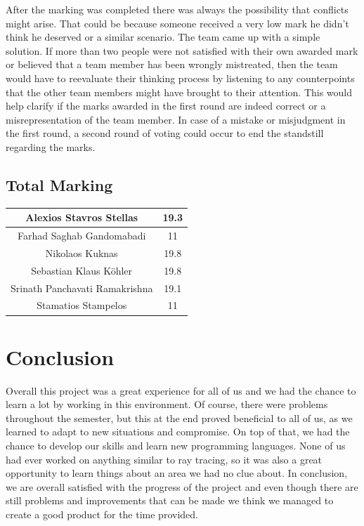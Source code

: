 \documentclass[10pt]{scrartcl}
\begin{document}
After the marking was completed there was always the possibility that conflicts might arise. That could be because someone received a very low mark he didn’t think he deserved or a similar scenario. The team came up with a simple solution. If more than two people were not satisfied with their own awarded mark or believed that a team member has been wrongly mistreated, then the team would have to reevaluate their thinking process by listening to any counterpoints that the other team members might have brought to their attention.  This would help clarify if the marks awarded in the first round are indeed correct or a misrepresentation of the team member. In case of a mistake or misjudgment in the first round, a second round of voting could occur to end the standstill regarding the marks.\par


\subsection{Total Marking}

\begin{center}
\begin{tabular}{ |c|c| } 
 \hline
 Alexios Stavros Stellas & 19.3  \\ 
 \hline
 Farhad Saghab Gandomabadi & 11 \\ 
 \hline
 Nikolaos Kuknas & 19.8 \\ 
 \hline
 Sebastian Klaus Köhler & 19.8 \\ 
 \hline
 Srinath Panchavati Ramakrishna & 19.1 \\ 
 \hline
 Stamatios Stampelos & 11 \\ 
 \hline
\end{tabular}
\end{center}

\section{Conclusion}
Overall this project was a great experience for all of us and we had the chance to learn a lot by working in this environment. Of course, there were problems throughout the semester, but this at the end proved beneficial to all of us, as we learned to adapt to new situations and compromise. On top of that, we had the chance to develop our skills and learn new programming languages. None of us had ever worked on anything similar to ray tracing, so it was also a great opportunity to learn things about an area we had no clue about. In conclusion, we are overall satisfied with the progress of the project and even though there are still problems and improvements that can be made we think we managed to create a good product for the time provided.



\end{document}
